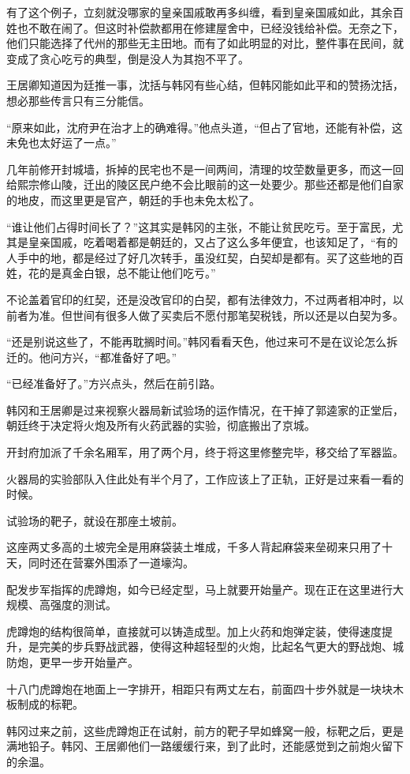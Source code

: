有了这个例子，立刻就没哪家的皇亲国戚敢再多纠缠，看到皇亲国戚如此，其余百姓也不敢在闹了。但这时补偿款都用在修建屋舍中，已经没钱给补偿。无奈之下，他们只能选择了代州的那些无主田地。而有了如此明显的对比，整件事在民间，就变成了贪心吃亏的典型，倒是没人为其抱不平了。

王居卿知道因为廷推一事，沈括与韩冈有些心结，但韩冈能如此平和的赞扬沈括，想必那些传言只有三分能信。

“原来如此，沈府尹在治才上的确难得。”他点头道，“但占了官地，还能有补偿，这未免也太好运了一点。”

几年前修开封城墙，拆掉的民宅也不是一间两间，清理的坟茔数量更多，而这一回给熙宗修山陵，迁出的陵区民户绝不会比眼前的这一处要少。那些还都是他们自家的地皮，而这里更是官产，朝廷的手也未免太松了。

“谁让他们占得时间长了？”这其实是韩冈的主张，不能让贫民吃亏。至于富民，尤其是皇亲国戚，吃着喝着都是朝廷的，又占了这么多年便宜，也该知足了，“有的人手中的地，都是经过了好几次转手，虽没红契，白契却是都有。买了这些地的百姓，花的是真金白银，总不能让他们吃亏。”

不论盖着官印的红契，还是没改官印的白契，都有法律效力，不过两者相冲时，以前者为准。但世间有很多人做了买卖后不愿付那笔契税钱，所以还是以白契为多。

“还是别说这些了，不能再耽搁时间。”韩冈看看天色，他过来可不是在议论怎么拆迁的。他问方兴，“都准备好了吧。”

“已经准备好了。”方兴点头，然后在前引路。

韩冈和王居卿是过来视察火器局新试验场的运作情况，在干掉了郭逵家的正堂后，朝廷终于决定将火炮及所有火药武器的实验，彻底搬出了京城。

开封府加派了千余名厢军，用了两个月，终于将这里修整完毕，移交给了军器监。

火器局的实验部队入住此处有半个月了，工作应该上了正轨，正好是过来看一看的时候。

试验场的靶子，就设在那座土坡前。

这座两丈多高的土坡完全是用麻袋装土堆成，千多人背起麻袋来垒砌来只用了十天，同时还在营寨外围添了一道壕沟。

配发步军指挥的虎蹲炮，如今已经定型，马上就要开始量产。现在正在这里进行大规模、高强度的测试。

虎蹲炮的结构很简单，直接就可以铸造成型。加上火药和炮弹定装，使得速度提升，是完美的步兵野战武器，使得这种超轻型的火炮，比起名气更大的野战炮、城防炮，更早一步开始量产。

十八门虎蹲炮在地面上一字排开，相距只有两丈左右，前面四十步外就是一块块木板制成的标靶。

韩冈过来之前，这些虎蹲炮正在试射，前方的靶子早如蜂窝一般，标靶之后，更是满地铅子。韩冈、王居卿他们一路缓缓行来，到了此时，还能感觉到之前炮火留下的余温。
